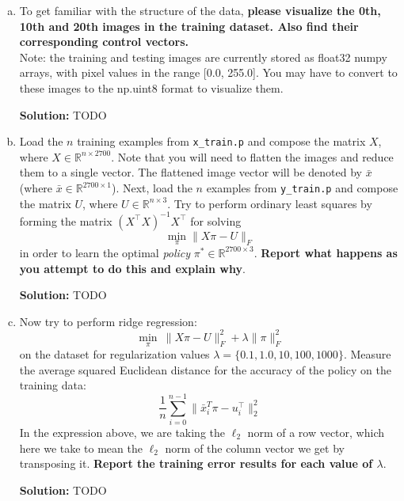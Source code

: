 \documentclass{article}
\newenvironment{solution}{\color{blue} \smallskip \textbf{Solution:}}{}
\begin{document}
\begin{enumerate}[(a)]
    \item To get familiar with the structure of the data, \textbf{please visualize the 0th, 10th and 20th images in the training dataset. Also find their corresponding control vectors.} \\
    Note: the training and testing images are currently stored as float32 numpy arrays, with pixel values in the range [0.0, 255.0]. You may have to convert to these images to the np.uint8 format to visualize them.

    \begin{solution}
        TODO
    \end{solution}

    \newpage
    \item Load the $n$ training examples from \texttt{x\_train.p} and compose the matrix $X$, where $X \in \mathbb{R}^{n\times 2700}$. Note that you will need to flatten the images and reduce them to a single vector. The flattened image vector will be denoted by $\bar{x}$ (where $\bar{x} \in \mathbb{R}^{2700\times 1}$). Next, load the $n$ examples from \texttt{y\_train.p} and compose the matrix $U$, where $U \in \mathbb{R}^{n\times 3}$. Try to perform ordinary least squares by forming the matrix $(X^\top X)^{-1}X^\top$ for solving
    \[\min_{\pi} \|X\pi-U \|_F\]
    in order to learn the optimal \emph{policy} $\pi^* \in \mathbb{R}^{2700 \times 3}$. \textbf{Report what happens as you attempt to do this and explain why}.

    \begin{solution}
        TODO
    \end{solution}

    \newpage
    \item Now try to perform ridge regression:
    \[\min_{\pi} \: \|X\pi - U\|_F^2 + \lambda \|\pi\|_F^2\]
    on the dataset for regularization values $\lambda = \lbrace 0.1, 1.0, 10, 100, 1000 \rbrace$. Measure the average squared Euclidean distance for the accuracy of the policy on the training data:
    \[\frac{1}{n}\sum_{i = 0}^{n-1} \|\bar{x}_i^T \pi - u_i^\top \|^2_2\] 
    In the expression above, we are taking the $\ell_2$ norm of a row vector, which here we take to mean the $\ell_2$ norm of the column vector we get by transposing it.
    \textbf{Report the training error results for each value of $\lambda$}.
    
    \begin{solution}
        TODO
    \end{solution}


\end{enumerate}
\end{document}
